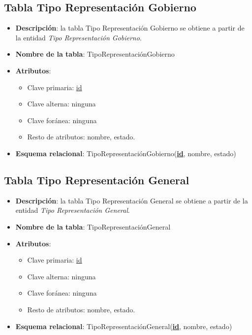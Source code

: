 \subsection{Tabla Tipo Representación Gobierno}
    \begin{itemize}
        \item \textbf{Descripción}: la tabla Tipo Representación Gobierno se obtiene a partir de la entidad \textit{Tipo Representación Gobierno}.
        \item \textbf{Nombre de la tabla}: TipoRepresentaciónGobierno
        \item \textbf{Atributos}:
            \begin{itemize}
                \item Clave primaria: \underline{id}
                \item Clave alterna: ninguna
                \item Clave foránea: ninguna
                \item Resto de atributos: nombre, estado.
            \end{itemize}
        \item \textbf{Esquema relacional}: 
            TipoRepresentaciónGobierno(\textbf{\underline{id}}, nombre, estado)
    \end{itemize}

\subsection{Tabla Tipo Representación General}
    \begin{itemize}
        \item \textbf{Descripción}: la tabla Tipo Representación General se obtiene a partir de la entidad \textit{Tipo Representación General}.
        \item \textbf{Nombre de la tabla}: TipoRepresentaciónGeneral
        \item \textbf{Atributos}:
            \begin{itemize}
                \item Clave primaria: \underline{id}
                \item Clave alterna: ninguna
                \item Clave foránea: ninguna
                \item Resto de atributos: nombre, estado.
            \end{itemize}
        \item \textbf{Esquema relacional}: 
            TipoRepresentaciónGeneral(\textbf{\underline{id}}, nombre, estado)
    \end{itemize}

